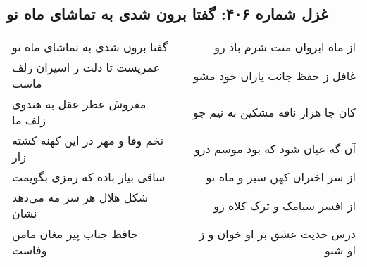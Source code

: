 \begin{center}
\section*{غزل شماره ۴۰۶: گفتا برون شدی به تماشای ماه نو}
\label{sec:sh406}
\begin{longtable}{l p{0.5cm} r}
گفتا برون شدی به تماشای ماه نو
&&
از ماه ابروان منت شرم باد رو
\\
عمریست تا دلت ز اسیران زلف ماست
&&
غافل ز حفظ جانب یاران خود مشو
\\
مفروش عطر عقل به هندوی زلف ما
&&
کان جا هزار نافه مشکین به نیم جو
\\
تخم وفا و مهر در این کهنه کشته زار
&&
آن گه عیان شود که بود موسم درو
\\
ساقی بیار باده که رمزی بگویمت
&&
از سر اختران کهن سیر و ماه نو
\\
شکل هلال هر سر مه می‌دهد نشان
&&
از افسر سیامک و ترک کلاه زو
\\
حافظ جناب پیر مغان مامن وفاست
&&
درس حدیث عشق بر او خوان و ز او شنو
\\
\end{longtable}
\end{center}
